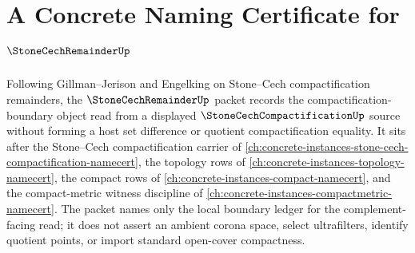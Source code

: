 \chapter{A Concrete Naming Certificate for $\StoneCechRemainderUp$}
\label{ch:concrete-instances-stone-cech-remainder-namecert}

Following Gillman--Jerison and Engelking on Stone--Cech compactification remainders, the $\StoneCechRemainderUp$ packet records the compactification-boundary object read from a displayed $\StoneCechCompactificationUp$ source without forming a host set difference or quotient compactification equality. It sits after the Stone--Cech compactification carrier of \autoref{ch:concrete-instances-stone-cech-compactification-namecert}, the topology rows of \autoref{ch:concrete-instances-topology-namecert}, the compact rows of \autoref{ch:concrete-instances-compact-namecert}, and the compact-metric witness discipline of \autoref{ch:concrete-instances-compactmetric-namecert}. The packet names only the local boundary ledger for the complement-facing read; it does not assert an ambient corona space, select ultrafilters, identify quotient points, or import standard open-cover compactness.


